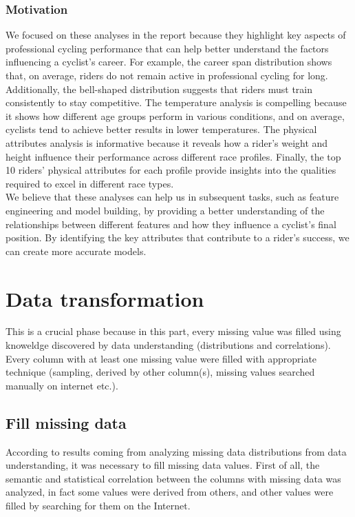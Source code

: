 \documentclass[a4paper, twoside]{article}
\begin{document}
\subsubsection{Motivation}
We focused on these analyses in the report because they highlight key aspects of professional cycling performance that can help better understand the factors influencing a cyclist's career. For example, the career span distribution shows that, on average, riders do not remain active in professional cycling for long. Additionally, the bell-shaped distribution suggests that riders must train consistently to stay competitive. The temperature analysis is compelling because it shows how different age groups perform in various conditions, and on average, cyclists tend to achieve better results in lower temperatures.
The physical attributes analysis is informative because it reveals how a rider's weight and height influence their performance across different race profiles. Finally, the top 10 riders' physical attributes for each profile provide insights into the qualities required to excel in different race types. \\
We believe that these analyses can help us in subsequent tasks, such as feature engineering and model building, by providing a better understanding of the relationships between different features and how they influence a cyclist's final position. By identifying the key attributes that contribute to a rider's success, we can create more accurate models.

\section{Data transformation}

This is a crucial phase because in this part, every missing value was filled using knoweldge discovered by data understanding (distributions and correlations). Every column with at least one missing value were filled with appropriate technique (sampling, derived by other column(s), missing values searched manually on internet etc.).

\subsection{Fill missing data}

According to results coming from analyzing missing data distributions from data understanding, it was necessary to fill missing data values. First of all, the semantic and statistical correlation between the columns with missing data was analyzed, in fact some values were derived from others, and other values were filled by searching for them on the Internet.
\end{document}
